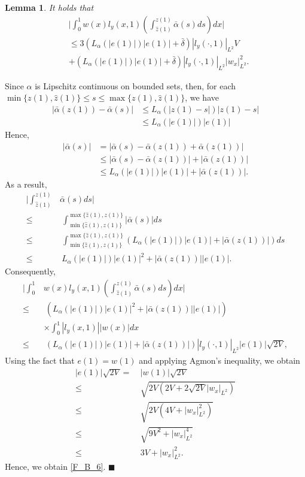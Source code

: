 \documentclass[twocolumn]{autart}
\newtheorem{lemm}{Lemma}
\newenvironment{lemma}{\begin{lemm}}{\hfill \end{lemm}}
\newenvironment{proof}{{\it Proof. }}{\hfill $\blacksquare$ }
\begin{document}
\begin{lemma}
It holds that 
\begin{align}
&\bigg| \int_{0}^{1}w(x)l_y(x,1)\left(\int_{\hat{z}(1)}^{z(1)}\bar{\alpha}(s)ds\right) dx\bigg| \nonumber \\
&\leq 3\left( L_{\alpha}(|e(1)|) |e(1)|+\bar{\delta}\right)|l_y(\cdot,1)|_{L^2}V \nonumber \\
&+\left( L_{\alpha}(|e(1)|) |e(1)|+\bar{\delta}\right)|l_y(\cdot,1)|_{L^2}|w_x|_{L^2}^2. \label{F_B_6}
\end{align}
\hfill  
\end{lemma}
\begin{proof}
Since $\alpha$ is Lipschitz continuous on bounded sets, then, for each $\min\{z(1),\hat{z}(1)\}\leq s\leq \max\{z(1),\hat{z}(1)\}$, we have
\begin{align*}
|\bar{\alpha}(z(1))-\bar{\alpha}(s)|&\leq L_{\alpha}(|z(1)-s|)|z(1)-s| \\
&\leq  L_{\alpha}(|e(1)|) |e(1)|
\end{align*}
Hence,
\begin{align*}
|\bar{\alpha}(s)|&=|\bar{\alpha}(s)-\bar{\alpha}(z(1))+\bar{\alpha}(z(1))| \\
&\leq |\bar{\alpha}(s)-\bar{\alpha}(z(1))|+|\bar{\alpha}(z(1))| \\
&\leq L_{\alpha}(|e(1)|) |e(1)| + |\bar{\alpha}(z(1))|.
\end{align*}
As a result, 
\begin{align}
\bigg|\int_{\hat{z}(1)}^{z(1)}&\bar{\alpha}(s)ds\bigg| \nonumber \\
\leq&~ \int_{\min\{\hat{z}(1),z(1)\}}^{\max\{\hat{z}(1),z(1)\}}|\bar{\alpha}(s)|ds \nonumber \\
\leq&~ \int_{\min\{\hat{z}(1),z(1)\}}^{\max\{\hat{z}(1),z(1)\}}\left(L_{\alpha}(|e(1)|) |e(1)| + |\bar{\alpha}(z(1))|\right)ds \nonumber \\
\leq&~ L_{\alpha}(|e(1)|) |e(1)|^2+|\bar{\alpha}(z(1))||e(1)|.\label{int_bound}
\end{align}
Consequently, 
\begin{align*}
\bigg| \int_{0}^{1}&w(x)l_y(x,1)\left(\int_{\hat{z}(1)}^{z(1)}\bar{\alpha}(s)ds\right) dx\bigg| \\
\leq&~ \left( L_{\alpha}(|e(1)|) |e(1)|^2+|\bar{\alpha}(z(1))||e(1)|\right) \\
&\times \int_{0}^{1}|l_y(x,1)||w(x)|dx \\
\leq&~ \left( L_{\alpha}(|e(1)|) |e(1)|+|\bar{\alpha}(z(1))|\right) |l_y(\cdot,1)|_{L^2} |e(1)| \sqrt{2V}, 
\end{align*}
Using the fact that $e(1)=w(1)$ and applying Agmon's inequality, we obtain 
\begin{align}
|e(1)|\sqrt{2V} =&~ |w(1)|\sqrt{2V} \nonumber \\
\leq&~ \sqrt{2V \left(2V+2\sqrt{2V} |w_x|_{L^2}\right)} \nonumber \\
\leq&~\sqrt{2V\left(4V+|w_x|_{L^2}^2\right)} \nonumber \\
\leq&~ \sqrt{9V^2+|w_x|_{L^2}^4} \nonumber\\
\leq&~ 3V+|w_x|_{L^2}^2. \label{vV}
\end{align}
Hence, we obtain \eqref{F_B_6}. 
\end{proof}
\end{document}
